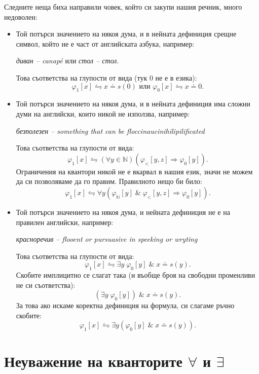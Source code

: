 \documentclass[12pt]{article}
\newcommand{\N}{\mathbb{N}}
\newcommand{\logand}{\; \& \;}
\theoremstyle{definition}
\begin{document}
Следните неща биха направили човек, който си закупи нашия речник, много недоволен:
\begin{itemize}
  \item Той потърси значението на някоя дума, и в нейната дефиниция срещне символ, който не е част от английската азбука, например:
        \begin{center}
          \textit{диван -- canapé} или \textit{стол -- стол}.
        \end{center}
        Това съответства на глупости от вида (тук $0$ не е в езика):
        \[
          \varphi_1[x] \leftrightharpoons x \doteq s(0) \text{ или } \varphi_0[x] \leftrightharpoons x \doteq 0.
        \]
  \item Той потърси значението на някоя дума, и в нейната дефиниция има сложни думи на английски, които никой не използва, например:
        \begin{center}
          \textit{безполезен -- something that can be floccinaucinihilipilificated}
        \end{center}
        Това съответства на глупости от вида:
        \[
          \varphi_1[x] \leftrightharpoons (\forall y \in \N) (\varphi_<[y, z] \Rightarrow \varphi_0[y]).
        \]
        Ограничения на квантори никой не е вкарвал в нашия език, значи не можем да си позволяваме да го правим.
        Правилното нещо би било:
        \[
          \varphi_1[x] \leftrightharpoons \forall y (\varphi_\N[y] \logand \varphi_<[y, z] \Rightarrow \varphi_0[y]).
        \]
  \item Той потърси значението на някоя дума, и нейната дефиниция не е на правилен английски, например:
        \begin{center}
          \textit{красноречив -- flooent or pursuasive in speeking or wryting}
        \end{center}
        Това съответства на глупости от вида:
        \[
          \varphi_1[x] \leftrightharpoons \exists y \; \varphi_0[y] \logand x \doteq s(y).
        \]
        Скобите имплицитно се слагат така (и въобще броя на свободни променливи не си съответства):
        \[
          (\exists y \; \varphi_0[y]) \logand x \doteq s(y).
        \]
        За това ако искаме коректна дефиниция на формула, си слагаме ръчно скобите:
        \[
          \varphi_1[x] \leftrightharpoons \exists y (\varphi_0[y] \logand x \doteq s(y)).
        \]
\end{itemize}

\section{Неуважение на кванторите $\forall$ и $\exists$}
\end{document}

